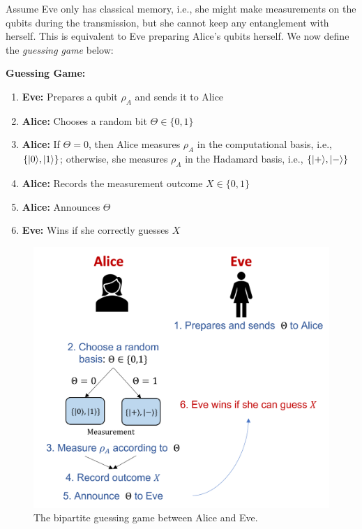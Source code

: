 
Assume Eve only has classical memory, i.e., she might make measurements on the qubits during the transmission, but she cannot keep any entanglement with herself. This is equivalent to Eve preparing Alice’s qubits herself. We now define the \textit{guessing game} below:

\begin{tcolorbox}
    {\bf Guessing Game:}
    \begin{enumerate}
        \item {\bf Eve:} Prepares a qubit $\rho_{A}$ and sends it to Alice
        \item {\bf Alice:} Chooses a random bit $\Theta \in \{0, 1\}$
        \item {\bf Alice:} If $\Theta = 0$, then Alice measures $\rho_{A}$ in the computational basis,  i.e., $\{|0 \rangle,|1 \rangle\}$; otherwise, she measures $\rho_{A}$ in the Hadamard basis,  i.e., $\{|+ \rangle,|- \rangle\}$
        \item {\bf Alice:} Records the measurement outcome $X \in \{0, 1\}$
        \item {\bf Alice:} Announces $\Theta$
        \item {\bf Eve:} Wins if she correctly guesses $X$
    \end{enumerate}
\end{tcolorbox}
\begin{figure}
    \centering
    \includegraphics[scale=0.5]{Images/uncertainty.png}
    \caption{The bipartite guessing game between Alice and Eve.}
    \label{fig:uncertainty}
\end{figure}
